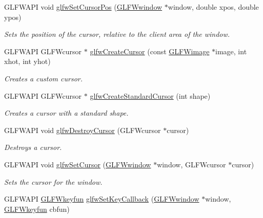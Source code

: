\begin{DoxyCompactItemize}
G\+L\+F\+W\+A\+P\+I void \hyperlink{group__input_gaaf152cc93418acb0ba342e3f4af922bc}{glfw\+Set\+Cursor\+Pos} (\hyperlink{group__window_ga3c96d80d363e67d13a41b5d1821f3242}{G\+L\+F\+Wwindow} $\ast$window, double xpos, double ypos)
\begin{DoxyCompactList}\small\item\em Sets the position of the cursor, relative to the client area of the window. \end{DoxyCompactList}\item 
G\+L\+F\+W\+A\+P\+I G\+L\+F\+Wcursor $\ast$ \hyperlink{group__input_gac0f0f691f2d110f9acfb4bfe07f1216c}{glfw\+Create\+Cursor} (const \hyperlink{structGLFWimage}{G\+L\+F\+Wimage} $\ast$image, int xhot, int yhot)
\begin{DoxyCompactList}\small\item\em Creates a custom cursor. \end{DoxyCompactList}\item 
G\+L\+F\+W\+A\+P\+I G\+L\+F\+Wcursor $\ast$ \hyperlink{group__input_ga969dd87ad2ddbf3e1086cc40f235eed1}{glfw\+Create\+Standard\+Cursor} (int shape)
\begin{DoxyCompactList}\small\item\em Creates a cursor with a standard shape. \end{DoxyCompactList}\item 
G\+L\+F\+W\+A\+P\+I void \hyperlink{group__input_ga27556b7122117bc1bbb4bb3cc003ea43}{glfw\+Destroy\+Cursor} (G\+L\+F\+Wcursor $\ast$cursor)
\begin{DoxyCompactList}\small\item\em Destroys a cursor. \end{DoxyCompactList}\item 
G\+L\+F\+W\+A\+P\+I void \hyperlink{group__input_gafaf103cea2f43530cff7de4e01126a4f}{glfw\+Set\+Cursor} (\hyperlink{group__window_ga3c96d80d363e67d13a41b5d1821f3242}{G\+L\+F\+Wwindow} $\ast$window, G\+L\+F\+Wcursor $\ast$cursor)
\begin{DoxyCompactList}\small\item\em Sets the cursor for the window. \end{DoxyCompactList}\item 
G\+L\+F\+W\+A\+P\+I \hyperlink{group__input_ga0192a232a41e4e82948217c8ba94fdfd}{G\+L\+F\+Wkeyfun} \hyperlink{group__input_gaa73bb92f628a2a0be9c132d56f19362c}{glfw\+Set\+Key\+Callback} (\hyperlink{group__window_ga3c96d80d363e67d13a41b5d1821f3242}{G\+L\+F\+Wwindow} $\ast$window, \hyperlink{group__input_ga0192a232a41e4e82948217c8ba94fdfd}{G\+L\+F\+Wkeyfun} cbfun)

\end{DoxyCompactItemize}
